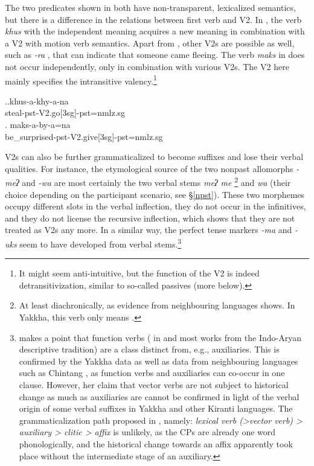 The two predicates shown in \Next both have non-transparent, lexicalized semantics, but there is a difference in the relations between first verb and V2. In \Next[a], the verb \emph{khus} with the independent meaning  acquires a new meaning in combination with a V2 with motion verb semantics. Apart from , other V2s are possible as well, such as \emph{-ra} , that can indicate that someone came fleeing. The verb \emph{maks} in \Next[b] does not occur independently, only in combination with various V2s. The  V2 here mainly specifies the intransitive valency.\footnote{It might seem anti-intuitive, but the function of the V2  is indeed detransitivization, similar to so-called  passives (more below).} 

\ex.\ag.khus-a-khy-a-na\\
steal{\sc -pst-V2.go[3sg]-pst=nmlz.sg}\\
\bg. maks-a-by-a=na\\
be\_surprised{\sc -pst-V2.give[3sg]-pst=nmlz.sg}\\


V2s can also be further grammaticalized to become suffixes and lose their verbal qualities. For instance, the etymological source of the two nonpast allomorphs \emph{-meʔ} and \emph{-wa} are most certainly the two verbal stems \emph{meʔ \ti me} \footnote{At least diachronically, as evidence from neighbouring languages shows. In Yakkha, this verb only means .} and \emph{wa}  (their choice depending on the participant scenario, see §\ref{npst}). These two morphemes occupy different slots in the verbal inflection,  they do not occur in the infinitives, and they do not license the recursive inflection, which shows that they are not treated as V2s any more. In a similar way, the perfect tense markers \emph{-ma} and \emph{-uks} seem to have developed from verbal stems.\footnote{\citet[66]{Butt2010_Light} makes a point that function verbs ( in \citet{Butt2010_Light} and most works from the  Indo-Aryan descriptive tradition) are a class distinct from, e.g., auxiliaries. This is confirmed by the Yakkha data as well as data from neighbouring languages such as Chintang \citep{Bickeletal2007Free}, as function verbs and auxiliaries can co-occur in one clause. However, her claim that vector verbs are not subject to historical change as much as auxiliaries are cannot be confirmed in light of the verbal origin of some verbal suffixes in Yakkha and other Kiranti languages. The grammaticalization path proposed in \citet[108]{Hopperetal1993Grammaticalization}, namely: \emph{lexical verb (>vector verb) > auxiliary > clitic > affix} is unlikely, as the CPs are already one word phonologically, and the historical change towards an affix apparently took place without the intermediate stage of an auxiliary.} 


